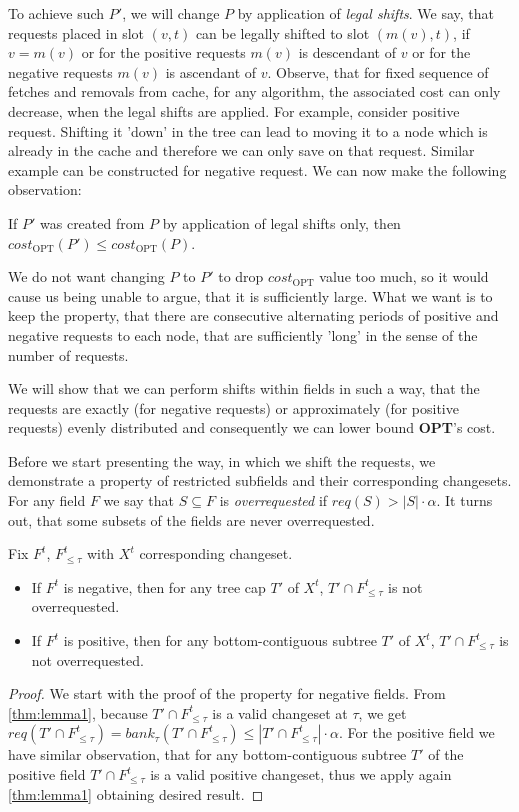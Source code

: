 To achieve such $P'$, we will change $P$ by application of \textit{legal
shifts}.  We say, that requests placed in slot $(v, t)$ can be legally shifted
to slot $(m(v), t)$, if $v = m(v)$ or for the positive requests $m(v)$ is
descendant of $v$ or for the negative requests $m(v)$ is ascendant of $v$.
Observe, that for fixed sequence of fetches and removals from cache, for any
algorithm, the associated cost can only decrease, when the legal shifts are
applied. For example, consider positive request.  Shifting it 'down' in the tree
can lead to moving it to a node which is already in the cache and therefore we
can only save on that request. Similar example can be constructed for negative
request. We can now make the following observation: \begin{observe} If $P'$ was
created from $P$ by application of legal shifts only, then
$cost_{\mathrm{OPT}}(P') \leq cost_{\mathrm{OPT}}(P)$.  \end{observe}

We do not want changing $P$ to $P'$ to drop $cost_{\mathrm{OPT}}$ value too
much, so it would cause us being unable to argue, that it is sufficiently large.
What we want is to keep the property, that there are consecutive alternating
periods of positive and negative requests to each node, that are sufficiently
'long' in the sense of the number of requests. 

We will show that we can perform shifts within fields in such a way, that the
requests are exactly (for negative requests) or approximately (for positive
requests) evenly distributed and consequently we can lower bound \textbf{OPT}'s
cost.

Before we start presenting the way, in which we shift the requests, we
demonstrate a property of restricted subfields and their corresponding
changesets.  For any field $F$ we say that $S \subseteq F$ is
\textit{overrequested} if $req(S) > |S| \cdot \alpha$. It turns out, that some
subsets of the fields are never overrequested.  \begin{lemma} Fix $F^t$,
$F^t_{\leq \tau}$ with $X^t$ corresponding changeset.  \begin{itemize} \item If
$F^t$ is negative, then for any tree cap $T'$ of $X^t$, $T' \cap F^t_{\leq
\tau}$ is not overrequested.  \item If $F^t$ is positive, then for any
bottom-contiguous subtree $T'$ of $X^t$, $T'\cap F^t_{\leq \tau}$ is not
overrequested.  \end{itemize} \label{thm:not_over_requested} \end{lemma}
\begin{proof} We start with the proof of the property for negative fields.  From
\ref{thm:lemma1}, because $T' \cap  F^t_{\leq \tau}$ is a valid changeset at
$\tau$, we get $req(T' \cap  F^t_{\leq \tau}) = bank_{\tau}(T' \cap F^t_{\leq
\tau}) \leq |T' \cap F^t_{\leq \tau}| \cdot \alpha$. For the positive field we
have similar observation, that for any bottom-contiguous subtree $T'$ of the
positive field $T'\cap F^t_{\leq \tau}$ is a valid positive changeset, thus we
apply again \ref{thm:lemma1} obtaining desired result.  \end{proof}

